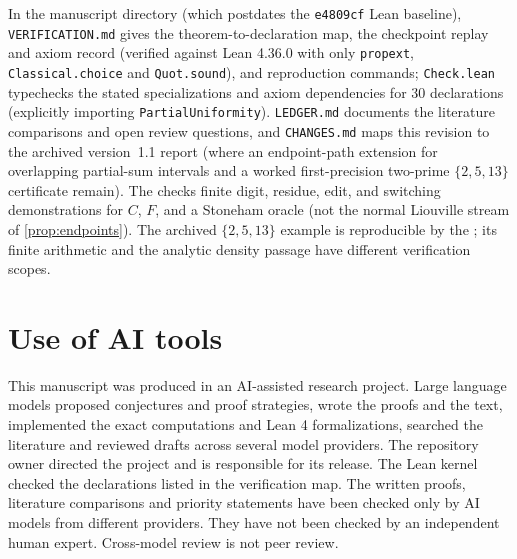 \documentclass[11pt]{article}
\begin{document}
In the manuscript directory (which postdates the \texttt{e4809cf} Lean baseline), \nolinkurl{VERIFICATION.md} gives the theorem-to-declaration map, the checkpoint replay and axiom record (verified against Lean 4.36.0 with only \texttt{propext}, \texttt{Classical.choice} and \texttt{Quot.sound}), and reproduction commands; \nolinkurl{Check.lean} typechecks the stated specializations and axiom dependencies for 30 declarations (explicitly importing \nolinkurl{PartialUniformity}). \nolinkurl{LEDGER.md} documents the literature comparisons and open review questions, and \nolinkurl{CHANGES.md} maps this revision to the archived version~1.1 report (where an endpoint-path extension for overlapping partial-sum intervals and a worked first-precision two-prime \(\{2,5,13\}\) certificate remain). The  checks finite digit, residue, edit, and switching demonstrations for \(C\), \(F\), and a Stoneham oracle (not the normal Liouville stream of \cref{prop:endpoints}). The archived \(\{2,5,13\}\) example is reproducible by the ; its finite arithmetic and the analytic density passage have different verification scopes.

\section{Use of AI tools}
This manuscript was produced in an AI-assisted research project. Large language models proposed conjectures and proof strategies, wrote the proofs and the text, implemented the exact computations and Lean 4 formalizations, searched the literature and reviewed drafts across several model providers. The repository owner directed the project and is responsible for its release. The Lean kernel checked the declarations listed in the verification map. The written proofs, literature comparisons and priority statements have been checked only by AI models from different providers. They have not been checked by an independent human expert. Cross-model review is not peer review.

\begingroup\small


\endgroup
\end{document}
